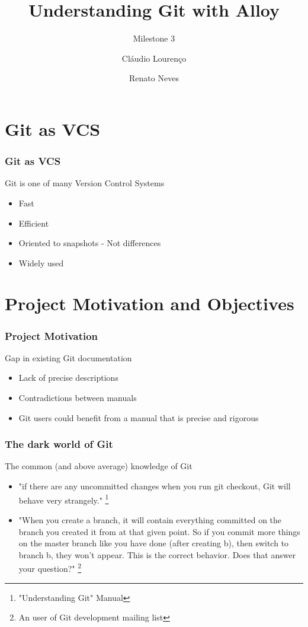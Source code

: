 \documentclass{beamer}
\title{Understanding Git with Alloy}
\subtitle{Milestone 3}
\author{Cláudio Lourenço \and Renato Neves}
\institute{University of Minho\\
Formal Methods in Software Engineering}
\begin{document}
\frame {
   \titlepage
}


\section{Git as VCS}

\begin{frame}
	\frametitle{Git as VCS}
	\begin{block}{Git is one of many Version Control Systems}
		\begin{itemize}
		\item Fast
		\item Efficient
		\item Oriented to snapshots - Not differences
		\item Widely used
	\end{itemize}
	\end{block}
\end{frame}

\section{Project Motivation and Objectives}
\begin{frame}
	\frametitle{Project Motivation}
	\begin{block}{Gap in existing Git documentation}
		\begin{itemize}
		\item Lack of precise descriptions
		\item Contradictions between manuals
		\item Git users could benefit from a manual that is precise and rigorous
	\end{itemize}
	\end{block}
\end{frame}

\begin{frame}
	\frametitle{The dark world of Git}
	\begin{block}{The common (and above average) knowledge of Git }
	\begin{itemize}
	\item "if there are any uncommitted changes when you run git checkout,
	 Git will behave very strangely." \footnote{"Understanding Git" Manual}
	\item "When you create a branch, it will contain everything
         committed on the branch you created it from at that given
         point. So if you commit more things on the master branch like
         you have done (after creating b), then switch to branch b,
         they won't appear. This is the correct behavior. Does that
         answer your question?" \footnote{An user of Git development 
	 mailing list} 
	\end{itemize}
	\end{block}
\end{frame}
\end{document}
